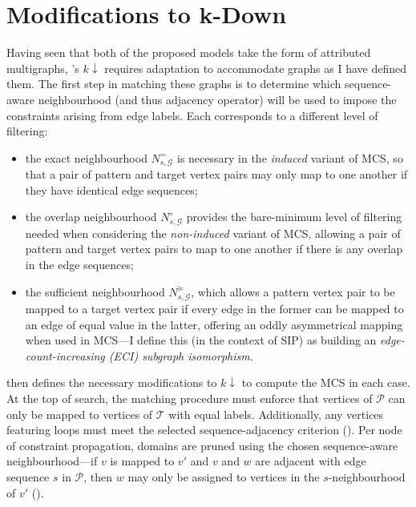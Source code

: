 \documentclass{mpaper}
\begin{document}

\section{Modifications to k-Down}
\label{sec:k-down-mods}

Having seen that both of the proposed models take the form of attributed multigraphs, \citeauthor{Between-MCS-SIP}'s $k\downarrow$ requires adaptation to accommodate graphs as I have defined them.
The first step in matching these graphs is to determine which sequence-aware neighbourhood (and thus adjacency operator) will be used to impose the constraints arising from edge labels.
Each corresponds to a different level of filtering:
\begin{itemize}
	\item the exact neighbourhood $N^{=}_{s,\mathcal{G}}$ is necessary in the \emph{induced} variant of MCS, so that a pair of pattern and target vertex pairs may only map to one another if they have identical edge sequences;
	
	\item the overlap neighbourhood $N^{\circ}_{s,\mathcal{G}}$ provides the bare-minimum level of filtering needed when considering the \emph{non-induced} variant of MCS, allowing a pair of pattern and target vertex pairs to map to one another if there is any overlap in the edge sequences;
	
	\item the sufficient neighbourhood $N^{\succcurlyeq}_{s,\mathcal{G}}$, which allows a pattern vertex pair to be mapped to a target vertex pair if every edge in the former can be mapped to an edge of equal value in the latter, offering an oddly asymmetrical mapping when used in MCS---I define this (in the context of SIP) as building an \emph{edge-count-increasing \emph{(ECI)} subgraph isomorphism}.
\end{itemize}

 then defines the necessary modifications to $k\downarrow$ to compute the MCS in each case.
At the top of search, the matching procedure must enforce that vertices of $\mathcal{P}$ can only be mapped to vertices of $\mathcal{T}$ with equal labels.
Additionally, any vertices featuring loops must meet the selected sequence-adjacency criterion ().
Per node of constraint propagation, domains are pruned using the chosen sequence-aware neighbourhood---if $v$ is mapped to $v'$ and $v$ and $w$ are adjacent with edge sequence $s$ in $\mathcal{P}$, then $w$ may only be assigned to vertices in the $s$-neighbourhood of $v'$ ().
\end{document}

